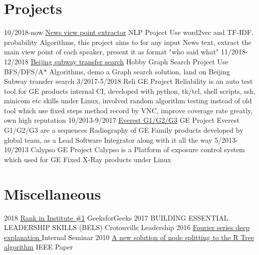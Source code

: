\documentclass[letterpaper,10pt]{Resume_Liang}
\begin{document}
\begin{body}
\section{Projects}
\begin{entrylist}
  \projectentry
    {10/2018-now}
    {\href{https://github.com/wangliangster/TestWL/blob/master/ViewPointExtract.ipynb}{News view point extractor}}
    {NLP Project}
    {Use word2vec and TF-IDF, probability Algorithms, this project aims to for any input News text, extract the main view point of each speaker, present it as format "who said what" }
  \projectentry
    {11/2018-12/2018}
    {\href{https://github.com/wangliangster/NLP-Course/blob/master/BeijingSubway.ipynb}{Beijing subway transfer search}}
    {Hobby Graph Search Project}
    {Use BFS/DFS/A* Algorithms, demo a Graph search solution, land on Beijing Subway transfer search}
    \projectentry
    {3/2017-5/2018}
    {Reli}
    {GE Project}
    {Reliability is an auto test tool for GE products internal CI, developed with python, tk/tcl, shell scripts, ssh, minicom etc skills under Linux, involved random algorithm testing instead of old tool which use fixed steps method record by VNC, improve coverage rate greatly, own high reputation }
     \projectentry
    {10/2013-9/2017}
    {\href{https://www.gehealthcare.com/en/products/radiography/fixed-rad-systems}{Everest G1/G2/G3}}
    {GE Project}
    {Everest G1/G2/G3 are a sequences Radiography of GE Family products developed by global team, as a Lead Software Integrator along with it all the way }
     \projectentry
    {5/2013-10/2013}
    {Calypso}
    {GE Project}
    {Calypso is a Platform of exposure control system which used for GE Fixed X-Ray products under Linux}
\end{entrylist}

\section{Miscellaneous}
\begin{entrylist}
   \otherentry
   {2018}
   {\href{https://auth.geeksforgeeks.org/user/\%E7\%8E\%8B\%E8\%89\%AF/practice/}{Rank in Institute \#1}}
   {GeeksforGeeks}
    \otherentry
    {2017}
    {BUILDING ESSENTIAL LEADERSHIP SKILLS (BELS) }
    {Crotonville Leadership}
     \otherentry
    {2016}
    {\href{https://github.com/wangliangster/TestWL/blob/master/Fouries\%20Transfer\%20Notes3.pdf}{Fourier series deep explanation }}
    {Internal Seminar }
    \otherentry
    {2010}
    {\href{https://ieeexplore.ieee.org/document/5564214}{A new solution of node splitting to the R Tree algorithm}}
    {IEEE Paper}
\end{entrylist}
\end{body}
\end{document}
